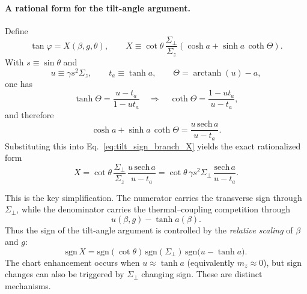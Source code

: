 \paragraph{A rational form for the tilt-angle argument.}
Define
\begin{equation}
    \tan\varphi = X(\beta,g,\theta),
    \qquad
    X \equiv \cot\theta\,\frac{\Sigma_\perp}{\Sigma_z}
    \left(\cosh a+\sinh a\,\coth\Theta\right).
    \label{eq:tilt_sign_branch_X}
\end{equation}
With $s\equiv \sin\theta$ and
\begin{equation}
    u\equiv \gamma s^2\Sigma_z,
    \qquad
    t_a\equiv \tanh a,
    \qquad
    \Theta=\operatorname{arctanh}(u)-a,
    \label{eq:tilt_sign_branch_u_ta_def}
\end{equation}
one has
\begin{equation}
    \tanh\Theta=\frac{u-t_a}{1-u t_a}
    \quad\Longrightarrow\quad
    \coth\Theta=\frac{1-u t_a}{u-t_a},
    \label{eq:tilt_sign_branch_coth_exact}
\end{equation}
and therefore
\begin{equation}
    \cosh a+\sinh a\,\coth\Theta
    =
    \frac{u\,\mathrm{sech}\,a}{u-t_a}.
    \label{eq:tilt_sign_branch_hyperbolic_factor_rational}
\end{equation}
Substituting this into Eq.~\eqref{eq:tilt_sign_branch_X} yields the exact rationalized form
\begin{equation}
    X
    =
    \cot\theta\,\frac{\Sigma_\perp}{\Sigma_z}\,
    \frac{u\,\mathrm{sech}\,a}{u-t_a}
    =
    \cot\theta\,\gamma s^2\Sigma_\perp\,
    \frac{\mathrm{sech}\,a}{u-t_a}.
    \label{eq:tilt_sign_branch_X_rational}
\end{equation}

This is the key simplification.  The numerator carries the transverse sign through $\Sigma_\perp$, while the
denominator carries the thermal--coupling competition through
\begin{equation}
    u(\beta,g)-\tanh a(\beta).
    \label{eq:tilt_sign_branch_scale_competition}
\end{equation}
Thus the sign of the tilt-angle argument is controlled by the \emph{relative scaling} of $\beta$ and $g$:
\begin{equation}
    \mathrm{sgn}\,X
    =
    \mathrm{sgn}(\cot\theta)\,
    \mathrm{sgn}(\Sigma_\perp)\,
    \mathrm{sgn}\!\bigl(u-\tanh a\bigr).
    \label{eq:tilt_sign_branch_signX}
\end{equation}
The chart enhancement occurs when $u\approx \tanh a$ (equivalently $m_z\approx 0$), but sign changes can also be
triggered by $\Sigma_\perp$ changing sign.  These are distinct mechanisms.

